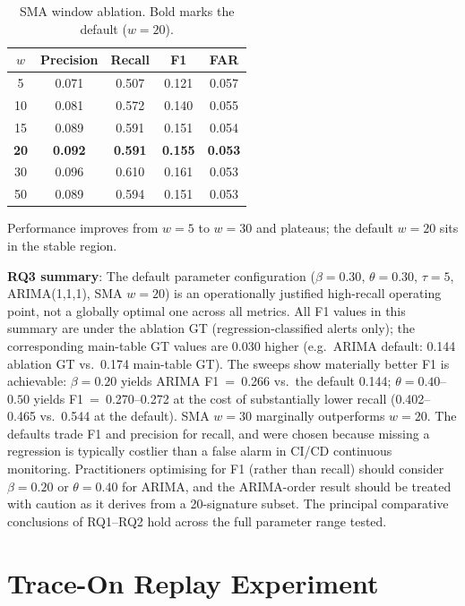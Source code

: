 \documentclass[pdflatex,sn-nature]{sn-jnl}
\theoremstyle{thmstyleone}%
\begin{document}
\begin{table}[tbp]
\centering
\begin{tabular}{ccccc}
\toprule
$w$ & Precision & Recall & F1 & FAR \\
\midrule
5  & 0.071 & 0.507 & 0.121 & 0.057 \\
10 & 0.081 & 0.572 & 0.140 & 0.055 \\
15 & 0.089 & 0.591 & 0.151 & 0.054 \\
\textbf{20} & \textbf{0.092} & \textbf{0.591} & \textbf{0.155} & \textbf{0.053} \\
30 & 0.096 & 0.610 & 0.161 & 0.053 \\
50 & 0.089 & 0.594 & 0.151 & 0.053 \\
\bottomrule
\end{tabular}
\caption{SMA window ablation. Bold marks the default ($w = 20$).}
\label{tab:ablation_sma}
\end{table}

Performance improves from $w=5$ to $w=30$ and plateaus; the default $w=20$
sits in the stable region.

\textbf{RQ3 summary}: The default parameter configuration ($\beta=0.30$,
$\theta=0.30$, $\tau=5$, ARIMA(1,1,1), SMA $w=20$) is an operationally
justified high-recall operating point, not a globally optimal one across
all metrics.
All F1 values in this summary are under the ablation GT
(regression-classified alerts only); the corresponding main-table GT values
are 0.030 higher (e.g.\ ARIMA default: 0.144 ablation GT vs.\ 0.174 main-table GT).
The sweeps show materially better F1 is achievable: $\beta=0.20$ yields
ARIMA F1~=~0.266 vs.\ the default 0.144; $\theta=0.40$--$0.50$ yields
F1~=~0.270--0.272 at the cost of substantially lower recall (0.402--0.465
vs.\ 0.544 at the default).
SMA $w=30$ marginally outperforms $w=20$.
The defaults trade F1 and precision for recall, and were chosen because
missing a regression is typically costlier than a false alarm in CI/CD
continuous monitoring.
Practitioners optimising for F1 (rather than recall) should consider
$\beta=0.20$ or $\theta=0.40$ for ARIMA, and the ARIMA-order result
should be treated with caution as it derives from a 20-signature subset.
The principal comparative conclusions of RQ1--RQ2 hold across the full
parameter range tested.

\section{Trace-On Replay Experiment}\label{sec:replay}
\end{document}
